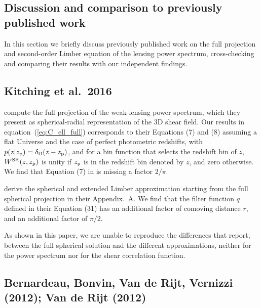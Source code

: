 \documentclass[fleqn,usenatbib]{mnras} %
\begin{document}
\begin{appendix}
\section{Discussion and comparison to previously published work}
\label{app:B}

In this section we briefly discuss previously published work on the full
projection and second-order Limber equation of the lensing power spectrum, cross-checking and comparing their
results with our independent findings.


\subsection{Kitching et al.~2016}

\cite{2016arXiv161104954K} compute the full projection of the weak-lensing
power spectrum, which they present as spherical-radial representation of the 3D
shear field. Our results in equation~(\ref{eq:C_ell_full}) corresponds to their
Equations (7) and (8) assuming a flat Universe and the case of perfect
photometric redshifts, with $p(z | z_{\rm p}) = \delta_{\rm D}(z - z_{\rm p})$,
and for a bin function that selects the redshift bin of $z$, $W^{\rm SR}(z,
z_{\rm p})$ is unity if $z_{\rm p}$ is in the redshift bin denoted by $z$,
and zero otherwise. We find that Equation (7) in \cite{2016arXiv161104954K} is
missing a factor $2/\pi$.

\cite{2016arXiv161104954K} derive the spherical and extended Limber
approximation starting from the full spherical projection in their Appendix.~A.
We find that the filter function $q$ defined in their Equation (31) has an
additional factor of comoving distance $r$, and an additional factor of
$\pi/2$.

As shown in this paper, we are unable to reproduce the differences that
\cite{2016arXiv161104954K} report, between the full spherical solution and the
different approximations, neither for the power spectrum nor for the shear
correlation function.


\subsection{Bernardeau, Bonvin, Van de Rijt, Vernizzi (2012); Van de Rijt (2012)}


\end{appendix}
\end{document}
